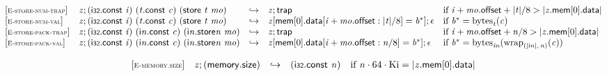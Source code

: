 $$
\begin{array}{@{}l@{}lcl@{}l@{}}
{[\textsc{\scriptsize E{-}store{-}num{-}trap}]} \quad & {\mathit{z}} ; (\mathsf{i{\scriptstyle32}}.\mathsf{const}~{\mathit{i}})~({\mathit{t}}.\mathsf{const}~{\mathit{c}})~(\mathsf{store}~{\mathit{t}}~{\mathit{mo}}) &\hookrightarrow& {\mathit{z}} ; \mathsf{trap} &\quad
  \mbox{if}~{\mathit{i}} + {\mathit{mo}}.\mathsf{offset} + {|{\mathit{t}}|} / 8 > {|{{\mathit{z}}.\mathsf{mem}}{{}[0]}.\mathsf{data}|} \\
{[\textsc{\scriptsize E{-}store{-}num{-}val}]} \quad & {\mathit{z}} ; (\mathsf{i{\scriptstyle32}}.\mathsf{const}~{\mathit{i}})~({\mathit{t}}.\mathsf{const}~{\mathit{c}})~(\mathsf{store}~{\mathit{t}}~{\mathit{mo}}) &\hookrightarrow& {\mathit{z}}{}[\mathsf{mem}{}[0].\mathsf{data}{}[{\mathit{i}} + {\mathit{mo}}.\mathsf{offset} : {|{\mathit{t}}|} / 8] = {{\mathit{b}}^\ast}] ; \epsilon &\quad
  \mbox{if}~{{\mathit{b}}^\ast} = {{\mathrm{bytes}}}_{{\mathit{t}}}({\mathit{c}}) \\
{[\textsc{\scriptsize E{-}store{-}pack{-}trap}]} \quad & {\mathit{z}} ; (\mathsf{i{\scriptstyle32}}.\mathsf{const}~{\mathit{i}})~({\mathsf{i}}{{\mathit{n}}}.\mathsf{const}~{\mathit{c}})~({{\mathsf{i}}{{\mathit{n}}}.\mathsf{store}}{{\mathit{n}}}~{\mathit{mo}}) &\hookrightarrow& {\mathit{z}} ; \mathsf{trap} &\quad
  \mbox{if}~{\mathit{i}} + {\mathit{mo}}.\mathsf{offset} + {\mathit{n}} / 8 > {|{{\mathit{z}}.\mathsf{mem}}{{}[0]}.\mathsf{data}|} \\
{[\textsc{\scriptsize E{-}store{-}pack{-}val}]} \quad & {\mathit{z}} ; (\mathsf{i{\scriptstyle32}}.\mathsf{const}~{\mathit{i}})~({\mathsf{i}}{{\mathit{n}}}.\mathsf{const}~{\mathit{c}})~({{\mathsf{i}}{{\mathit{n}}}.\mathsf{store}}{{\mathit{n}}}~{\mathit{mo}}) &\hookrightarrow& {\mathit{z}}{}[\mathsf{mem}{}[0].\mathsf{data}{}[{\mathit{i}} + {\mathit{mo}}.\mathsf{offset} : {\mathit{n}} / 8] = {{\mathit{b}}^\ast}] ; \epsilon &\quad
  \mbox{if}~{{\mathit{b}}^\ast} = {{\mathrm{bytes}}}_{{{\mathit{i}}}{{\mathit{n}}}}({{{\mathrm{wrap}}}_{({|{\mathsf{i}}{{\mathit{n}}}|},\, {\mathit{n}})}}{({\mathit{c}})}) \\
\end{array}
$$

\vspace{1ex}

$$
\begin{array}{@{}l@{}lcl@{}l@{}}
{[\textsc{\scriptsize E{-}memory.size}]} \quad & {\mathit{z}} ; (\mathsf{memory.size}) &\hookrightarrow& (\mathsf{i{\scriptstyle32}}.\mathsf{const}~{\mathit{n}}) &\quad
  \mbox{if}~{\mathit{n}} \cdot 64 \cdot {\mathrm{Ki}} = {|{{\mathit{z}}.\mathsf{mem}}{{}[0]}.\mathsf{data}|} \\
\end{array}
$$

